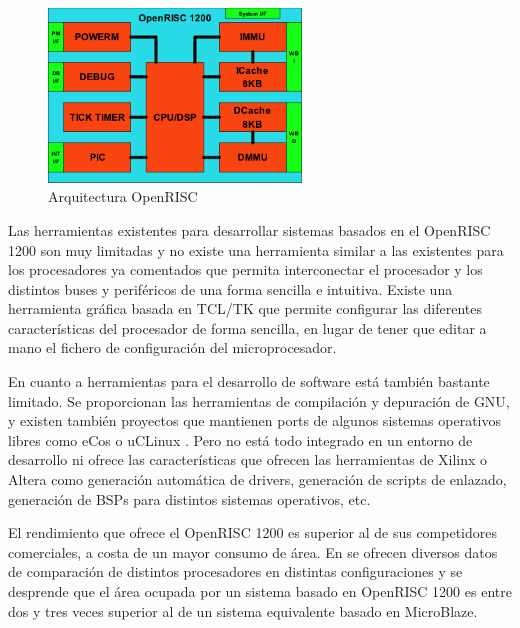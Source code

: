 \begin{figure}[h!]
 	\begin{center}
  	\includegraphics[width=0.6\textwidth,keepaspectratio=true]{./images/OR1200}
  	\caption{Arquitectura OpenRISC}
 	\end{center}
	\end{figure}


Las herramientas existentes para desarrollar sistemas basados en el OpenRISC 1200 son muy limitadas y no existe una herramienta similar a las existentes para los procesadores ya comentados que permita interconectar el procesador y los distintos buses y periféricos de una forma sencilla e intuitiva. Existe una herramienta gráfica basada en TCL/TK que permite configurar las diferentes características del procesador de forma sencilla\cite{Etiqueta29}, en lugar de tener que editar a mano el fichero de configuración del microprocesador.

En cuanto a herramientas para el desarrollo de software está también bastante limitado. Se proporcionan las herramientas de compilación y depuración de GNU, y existen también proyectos que mantienen ports de algunos sistemas operativos libres como eCos\cite{Etiqueta30} o uCLinux \cite{Etiqueta31}. Pero no está todo integrado en un entorno de desarrollo ni ofrece las características que ofrecen las herramientas de Xilinx o Altera como generación automática de drivers, generación de scripts de enlazado, generación de BSPs para distintos sistemas operativos, etc.

El rendimiento que ofrece el OpenRISC 1200 es superior al de sus competidores comerciales, a costa de un mayor consumo de área. En \cite{Etiqueta32} se ofrecen diversos datos de comparación de distintos procesadores en distintas configuraciones y se desprende que el área ocupada por un sistema basado en OpenRISC 1200 es entre dos y tres veces superior al de un sistema equivalente basado en MicroBlaze.


